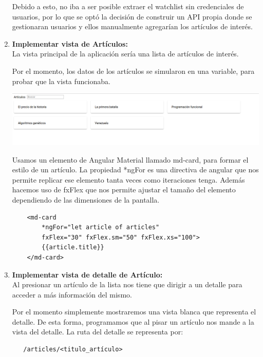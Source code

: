 \begin{enumerate}
  Debido a esto, no iba a ser posible extraer el watchlist sin credenciales de usuarios, por lo que se optó la decisión de construir un API propia donde se gestionaran usuarios y ellos manualmente agregarían los artículos de interés.
  
  \item\textbf{Implementar vista de Artículos:}\\
  
  La vista principal de la aplicación sería una lista de artículos de interés.
  
  Por el momento, los datos de los artículos se simularon en una variable, para probar que la vista funcionaba.
  \begin{center}
      \bigbreak
      \includegraphics[scale=0.2]{images/marco_aplicativo/lista_articulos.png}
      \label{fig:githubBoard}
      \bigbreak
  \end{center}
  
  Usamos un elemento de Angular Material llamado md-card, para formar el estilo de un artículo. La propiedad *ngFor es una directiva de angular que nos permite replicar ese elemento tanta veces como iteraciones tenga. Además hacemos uso de fxFlex que nos permite ajustar el tamaño del elemento dependiendo de las dimensiones de la pantalla.
  \begin{verbatim}
    <md-card 
        *ngFor="let article of articles"
        fxFlex="30" fxFlex.sm="50" fxFlex.xs="100">
        {{article.title}}
    </md-card>
  \end{verbatim}
  
  \item\textbf{Implementar vista de detalle de  Artículo:}\\
  Al presionar un artículo de la lista nos tiene que  dirigir a un detalle para acceder a más información del mismo.
  
  Por el momento simplemente mostraremos una vista blanca que representa el detalle. De esta forma, programamos que al pisar un artículo nos mande a la vista del detalle. La ruta del detalle se representa por: 
  \begin{verbatim}
   /articles/<titulo_artículo>
  \end{verbatim}
  

\end{enumerate}
